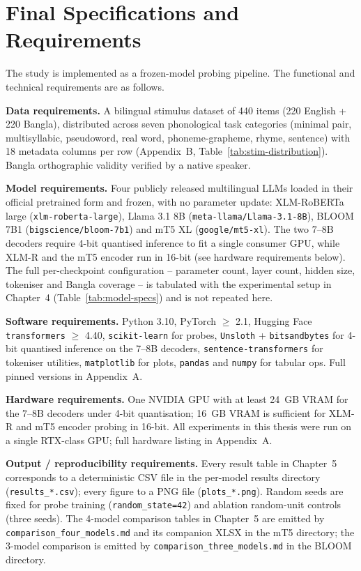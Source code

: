 \section{Final Specifications and Requirements}

The study is implemented as a frozen-model probing pipeline. The functional and technical requirements are as follows.

\textbf{Data requirements.} A bilingual stimulus dataset of 440 items (220 English + 220 Bangla), distributed across seven phonological task categories (minimal pair, multisyllabic, pseudoword, real word, phoneme-grapheme, rhyme, sentence) with 18 metadata columns per row (Appendix~B, Table~\ref{tab:stim-distribution}). Bangla orthographic validity verified by a native speaker.

\textbf{Model requirements.} Four publicly released multilingual LLMs loaded in their official pretrained form and frozen, with no parameter update: XLM-RoBERTa large (\texttt{xlm-roberta-large}), Llama 3.1 8B (\texttt{meta-llama/Llama-3.1-8B}), BLOOM 7B1 (\texttt{bigscience/bloom-7b1}) and mT5 XL (\texttt{google/mt5-xl}). The two 7--8B decoders require 4-bit quantised inference to fit a single consumer GPU, while XLM-R and the mT5 encoder run in 16-bit (see hardware requirements below). The full per-checkpoint configuration -- parameter count, layer count, hidden size, tokeniser and Bangla coverage -- is tabulated with the experimental setup in Chapter~4 (Table~\ref{tab:model-specs}) and is not repeated here.

\textbf{Software requirements.} Python 3.10, PyTorch $\geq$ 2.1, Hugging Face \texttt{transformers} $\geq$ 4.40, \texttt{scikit-learn} for probes, \texttt{Unsloth} + \texttt{bitsandbytes} for 4-bit quantised inference on the 7--8B decoders, \texttt{sentence-transformers} for tokeniser utilities, \texttt{matplotlib} for plots, \texttt{pandas} and \texttt{numpy} for tabular ops. Full pinned versions in Appendix~A.

\textbf{Hardware requirements.} One NVIDIA GPU with at least 24~GB VRAM for the 7--8B decoders under 4-bit quantisation; 16~GB VRAM is sufficient for XLM-R and mT5 encoder probing in 16-bit. All experiments in this thesis were run on a single RTX-class GPU; full hardware listing in Appendix~A.

\textbf{Output / reproducibility requirements.} Every result table in Chapter~5 corresponds to a deterministic CSV file in the per-model results directory (\texttt{results\_*.csv}); every figure to a PNG file (\texttt{plots\_*.png}). Random seeds are fixed for probe training (\texttt{random\_state=42}) and ablation random-unit controls (three seeds). The 4-model comparison tables in Chapter~5 are emitted by \texttt{comparison\_four\_models.md} and its companion XLSX in the mT5 directory; the 3-model comparison is emitted by \texttt{comparison\_three\_models.md} in the BLOOM directory.

